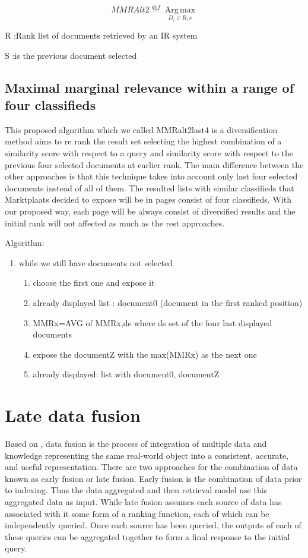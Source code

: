 \begin{equation}
MMRAlt2\overset{def}{=}\operatorname*{Arg \, \max}_{D_{i}\in R,s}
\end{equation}


R :Rank list of documents retrieved by an IR system

S :is the previous document selected


\subsection{Maximal marginal relevance within a range of four classifieds}

This proposed algorithm which we called MMRalt2last4 is a diversification method aims to re rank the result set selecting the highest combination of a similarity score with respect to a query and similarity score with respect to the previous four selected documents at earlier rank. The main difference between the other approaches is that this technique takes into account only last four selected documents instead of all of them. The resulted lists with similar classifieds that Marktplaats decided to expose will be in pages consist of four classifieds. With our proposed way, each page will be always consist of diversified results and the initial rank will not affected as much as the rest approaches. 

Algorithm:
\begin{enumerate}
\item while we still have documents not selected
	\begin{enumerate}
	\item choose the first one and expose it
	\item already displayed list : document0 (document in the first ranked position)
	\item MMRx=AVG of MMRx,ds where ds set of the four last displayed documents
	\item expose the documentZ with the max(MMRx) as the next one
	\item already displayed: list with document0, documentZ
	\end{enumerate}
\end{enumerate}


\section{Late data fusion}

Based on \cite{Wilkins}, data fusion is the process of integration of multiple data and knowledge representing the same real-world object into a consistent, accurate, and useful representation. There are two approaches for the combination of data known as early fusion or late fusion. Early fusion is the combination of data prior to indexing. Thus the data aggregated and then retrieval model use this aggregated data as input. While late fusion assumes each source of data has associated with it some form of a ranking function, each of which can be independently queried. Once each source has been queried, the outputs of each of these queries can be aggregated together to form a final response to the initial query.

